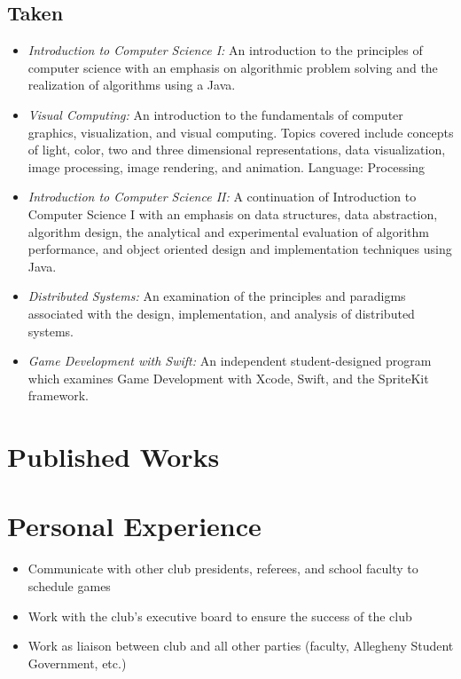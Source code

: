 \documentclass[11pt,a4paper,sans]{moderncv} %
\begin{document}
{{\subsection{Taken}
\begin{itemize}
\item {\textit{Introduction to Computer Science I: }{An introduction to the principles of computer science with an emphasis on algorithmic problem solving and the realization of algorithms using a Java.}}
\item{\textit{Visual Computing: }{An introduction to the fundamentals of computer graphics, visualization, and visual computing. Topics covered include concepts of light, color, two and three dimensional representations, data visualization, image processing, image rendering, and animation. Language: Processing}}
\item{\textit{Introduction to Computer Science II: }{A continuation of Introduction to Computer Science I with an emphasis on data structures, data abstraction, algorithm design, the analytical and experimental evaluation of algorithm performance, and object oriented design and implementation techniques using Java.}}
\item{\textit{Distributed Systems: }{An examination of the principles and paradigms associated with the design, implementation, and analysis of distributed systems.}}
\item{\textit{Game Development with Swift: }{ An independent student-designed program which examines Game Development with Xcode, Swift, and the SpriteKit framework.}}
\end{itemize}


\section{Published Works}


\section{Personal Experience}
\begin{itemize}
\item{Communicate with other club presidents, referees, and school faculty to schedule games}
\item{Work with the club's executive board to ensure the success of the club}
\item{Work as liaison between club and all other parties (faculty, Allegheny Student Government, etc.) }
\end{itemize}

}}
\end{document}

